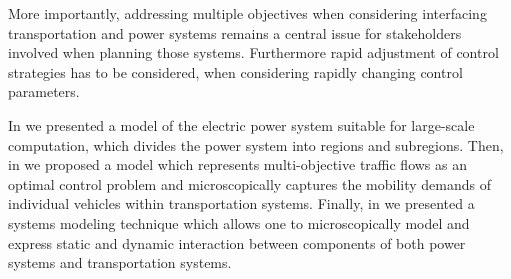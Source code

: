 
More importantly, addressing multiple objectives when considering interfacing transportation and power systems remains a central issue for stakeholders involved when planning those systems. 
Furthermore rapid adjustment of control strategies has to be considered, when considering rapidly changing control parameters.



In \cite{Hackenberg2012} we presented a model of the electric power system suitable for large-scale computation, which divides the power system into regions and subregions.
Then, in \cite{ascher2014early} we proposed a model which represents multi-objective traffic flows as an optimal control problem and microscopically captures the mobility demands of individual vehicles within transportation systems.
Finally, in \cite{ascher2015integrated} we presented a systems modeling technique which allows one to microscopically model and express static and dynamic interaction between components of both power systems and transportation systems.


